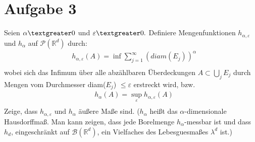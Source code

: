 \documentclass[12pt,a4paper]{article}
\begin{document}
\section{Aufgabe 3}
Seien $\alpha \textgreater 0$ und $ \varepsilon \textgreater 0.$ Definiere Mengenfunktionen $h_{\alpha, \varepsilon}$ und $h_{\alpha}$ auf $\mathscr{P}(\mathbb{R}^d)$ durch:
\begin{align*}
	&h_{\alpha, \varepsilon}(A) = \inf\sum_{j=1}^{\infty}(diam(E_j))^{\alpha}\\
\end{align*}
wobei sich das Infimum  über alle abzählbaren Überdeckungen $A \subset \bigcup_jE_j$ durch Mengen vom Durchmesser diam($E_j$) $\leq \varepsilon$ erstreckt wird, bzw.
\begin{align*}
	&h_{\alpha}(A) = \sup_{\varepsilon}h_{\alpha, \varepsilon}(A)\\
\end{align*}
Zeige, dass $h_{\alpha, \varepsilon}$ und $h_{\alpha}$ äußere Maße sind. ($h_{\alpha}$ heißt das $\alpha$-dimensionale Hausdorffmaß. Man kann zeigen, dass jede Borelmenge $h_{\alpha}$-messbar ist und dass $h_d$, eingeschränkt auf $\mathscr{B}(\mathbb{R}^d)$, ein Vielfaches des Lebesguesmaßes $\lambda^d$ ist.)\\
\end{document}
